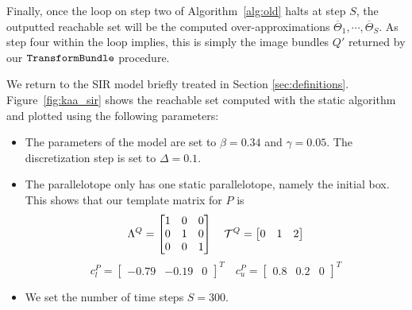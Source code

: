 Finally, once the loop on step two of Algorithm~\ref{alg:old} halts at step $S$, the outputted reachable set will be the computed over-approximations $\overline\Theta_1, \cdots, \overline\Theta_S$. As step four within the loop implies, this is simply the image bundles $Q'$ returned by our $\texttt{TransformBundle}$ procedure.



%



\begin{example}
  We return to the SIR model briefly treated in Section \ref{sec:definitions}. Figure~\ref{fig:kaa_sir} shows the reachable set computed with the static algorithm and plotted using the following parameters:
  \begin{itemize}
    \item The parameters of the model are set to $\beta = 0.34$ and $\gamma = 0.05$. The discretization step is set to $\Delta = 0.1$.
    \item The parallelotope only has one static parallelotope, namely the initial box. This shows that our template matrix for $P$ is
        \begin{equation*}
          \Lambda^Q = \begin{bmatrix}
                      1 & 0 & 0 \\
                      0 & 1 & 0 \\
                      0 & 0 & 1
                      \end{bmatrix}
                      \quad
          \mathcal{T}^Q = \begin{bmatrix}
                      0 & 1 & 2 \\
                      \end{bmatrix}
        \end{equation*}
        \begin{equation*}
            c_l^P = \begin{bmatrix} -0.79 & -0.19 & 0 \end{bmatrix}^T \quad c_u^P = \begin{bmatrix} 0.8 & 0.2 & 0 \end{bmatrix}^T
        \end{equation*}
    \item We set the number of time steps $S = 300$.
  \end{itemize}


\end{example}
